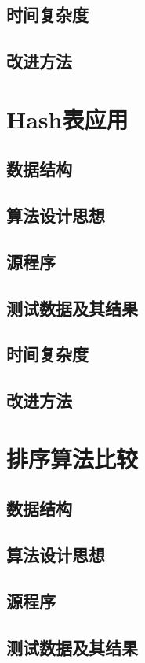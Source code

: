\documentclass[a4paper,11pt,UTF8]{ctexart}
\begin{document}
\subsection{时间复杂度}
\subsection{改进方法}

\section{Hash表应用}
\subsection{数据结构}
\subsection{算法设计思想}
\subsection{源程序}
\subsection{测试数据及其结果}
\subsection{时间复杂度}
\subsection{改进方法}

\section{排序算法比较}
\subsection{数据结构}
\subsection{算法设计思想}
\subsection{源程序}
\subsection{测试数据及其结果}
\end{document}
